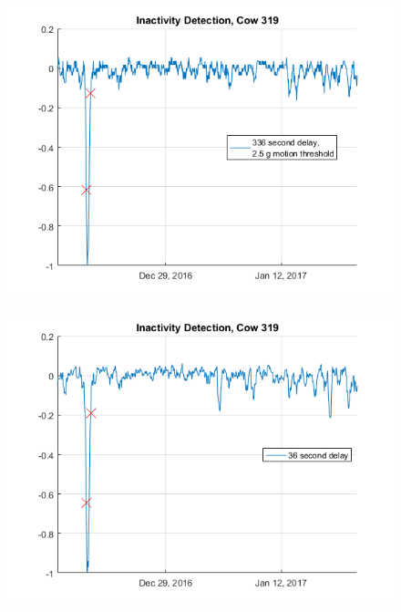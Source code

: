 \begin{figure}[htb]
\centering
\includegraphics[width = 0.75 \textwidth]{figures/InactivityDetectionCow319_336period2_5threshold.png}
\caption{}
\label{InactivityDetectionCow319_336period2_5threshold}
\end{figure}

\begin{figure}[htb]
\centering
\includegraphics[width = 0.75 \textwidth]{figures/InactivityDetectionCow319_36period.png}
\caption{}
\label{InactivityDetectionCow319_36period}
\end{figure}




